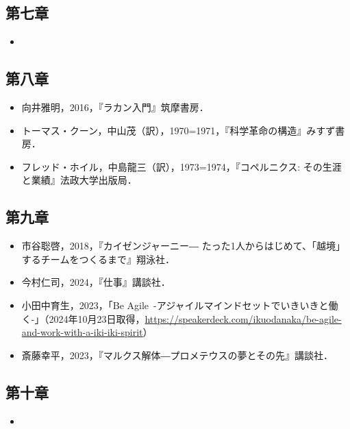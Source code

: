 \subsection{第七章}\label{ux7b2cux4e03ux7ae0}

\begin{itemize}
\tightlist
\item
\end{itemize}

\subsection{第八章}\label{ux7b2cux516bux7ae0}

\begin{itemize}
\tightlist
\item
  向井雅明，2016，『ラカン入門』筑摩書房．
\item
  トーマス・クーン，中山茂（訳），1970=1971，『科学革命の構造』みすず書房．
\item
  フレッド・ホイル，中島龍三（訳），1973=1974，『コペルニクス:
  その生涯と業績』法政大学出版局．
\end{itemize}

\subsection{第九章}\label{ux7b2cux4e5dux7ae0}

\begin{itemize}
\tightlist
\item
  市谷聡啓，2018，『カイゼンジャーニー―
  たった1人からはじめて、「越境」するチームをつくるまで』翔泳社．
\item
  今村仁司，2024，『仕事』講談社．
\item
  小田中育生，2023，「Be
  Agile~-アジャイルマインドセットでいきいきと働く-」（2024年10月23日取得，\url{https://speakerdeck.com/ikuodanaka/be-agile-and-work-with-a-iki-iki-spirit}）
\item
  斎藤幸平，2023，『マルクス解体―プロメテウスの夢とその先』講談社．
\end{itemize}

\subsection{第十章}\label{ux7b2cux5341ux7ae0}

\begin{itemize}
\tightlist
\item
\end{itemize}

